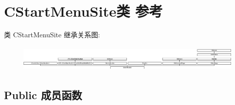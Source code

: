 \hypertarget{class_c_start_menu_site}{}\section{C\+Start\+Menu\+Site类 参考}
\label{class_c_start_menu_site}
类 C\+Start\+Menu\+Site 继承关系图\+:\begin{figure}[H]
\begin{center}
\leavevmode
\includegraphics[height=1.325758cm]{class_c_start_menu_site}
\end{center}
\end{figure}
\subsection*{Public 成员函数}
